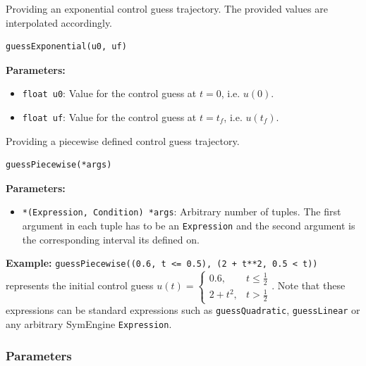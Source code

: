 \documentclass[12pt]{article}
\begin{document}
\begin{mdframed}[backgroundcolor=gray!10, roundcorner=10pt, linewidth=1pt]

	Providing an exponential control guess trajectory. The provided values
	are interpolated accordingly.

	\begin{lstlisting}
guessExponential(u0, uf)
	\end{lstlisting}

	\textbf{Parameters:}
	\begin{itemize}
		\item \texttt{float u0}: Value for the control guess at $t=0$,
		      i.e. $u(0)$.
		\item \texttt{float uf}: Value for the control guess at
		      $t=t_f$, i.e. $u(t_f)$.
	\end{itemize}

\end{mdframed}

\begin{mdframed}[backgroundcolor=gray!10, roundcorner=10pt, linewidth=1pt]

	Providing a piecewise defined control guess trajectory.

	\begin{lstlisting}
guessPiecewise(*args)
	\end{lstlisting}

	\textbf{Parameters:}
	\begin{itemize}
		\item \texttt{*(Expression, Condition) *args}: Arbitrary number
		      of tuples. The first argument in each tuple has to be an
		      \texttt{Expression} and the second argument is the corresponding interval its
		      defined on.

	\end{itemize}

	\textbf{Example:} \texttt{guessPiecewise((0.6, t <= 0.5), (2 + t**2,
		0.5 < t))} represents the initial control guess $u(t) =
		\begin{cases}
			0.6,     & t \leq \frac{1}{2} \\
			2 + t^2, & t > \frac{1}{2}
		\end{cases}$. Note that these expressions can be standard
	expressions
	such as \texttt{guessQuadratic}, \texttt{guessLinear} or any arbitrary
	SymEngine \texttt{Expression}.
\end{mdframed}

\subsubsection{Parameters}
\end{document}

